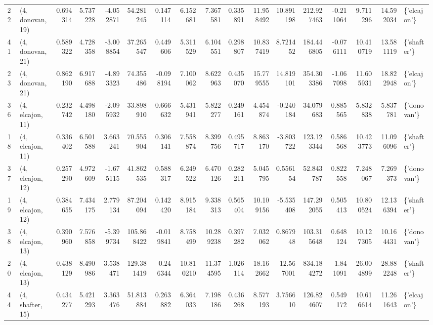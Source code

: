 \begin{tabular}{llrrrrrrrrrrrrrrl}
22 &  (4, donovan, 19) &   0.694314 &   5.737228 & -4.052871 &   54.281245 &  0.147114 &   6.152681 &   7.367581 &  0.335891 &  11.958492 &  10.891198 &  212.927463 & -0.211064 &   9.711296 &  14.592034 &  \{'elcajon'\} \\
41 &  (4, donovan, 21) &   0.589322 &   4.728358 & -3.008854 &   37.265547 &  0.449606 &   5.311529 &   6.104551 &  0.298807 &  10.837419 &   8.721452 &  184.446805 & -0.076111 &  10.410719 &  13.581119 &  \{'shafter'\} \\
23 &  (4, donovan, 21) &   0.862190 &   6.917688 & -4.893323 &   74.355486 & -0.098194 &   7.100062 &   8.622963 &  0.435070 &  15.779555 &  14.819101 &  354.303386 & -1.067098 &  11.605931 &  18.822948 &  \{'elcajon'\} \\
36 &  (4, elcajon, 11) &   0.232742 &   4.498180 & -2.095932 &   33.898910 &  0.666632 &   5.431941 &   5.822277 &  0.249161 &   4.454874 &  -0.240184 &   34.079683 &  0.885565 &   5.832838 &   5.837781 &  \{'donovan'\} \\
18 &  (4, elcajon, 11) &   0.336402 &   6.501588 &  3.663241 &   70.555904 &  0.306141 &   7.558874 &   8.399756 &  0.495717 &   8.863170 &  -3.803722 &  123.123344 &  0.586568 &  10.423773 &  11.096096 &  \{'shafter'\} \\
37 &  (4, elcajon, 12) &   0.257290 &   4.972609 & -1.675115 &   41.862535 &  0.588317 &   6.249522 &   6.470126 &  0.282211 &   5.045795 &   0.556154 &   52.843787 &  0.822558 &   7.248067 &   7.269373 &  \{'donovan'\} \\
19 &  (4, elcajon, 12) &   0.384655 &   7.434175 &  2.779134 &   87.204094 &  0.142420 &   8.915184 &   9.338313 &  0.565404 &  10.109156 &  -5.535408 &  147.292055 &  0.505413 &  10.800524 &  12.136394 &  \{'shafter'\} \\
38 &  (4, elcajon, 13) &   0.390960 &   7.576858 & -5.399734 &  105.868422 & -0.019841 &   8.758499 &  10.289238 &  0.397282 &   7.032062 &   0.867948 &  103.315648 &  0.648124 &  10.127305 &  10.164431 &  \{'donovan'\} \\
20 &  (4, elcajon, 13) &   0.438129 &   8.490986 &  3.538471 &  129.381419 & -0.246344 &  10.810210 &  11.374595 &  1.026114 &  18.162662 & -12.567001 &  834.184272 & -1.841091 &  26.004899 &  28.882248 &  \{'shafter'\} \\
44 &  (4, shafter, 15) &   0.434277 &   5.421293 &  3.363476 &   51.813884 &  0.263882 &   6.364033 &   7.198186 &  0.436268 &   8.577193 &   3.756610 &  126.824607 &  0.549172 &  10.616614 &  11.261643 &  \{'elcajon'\} \\

\end{tabular}

